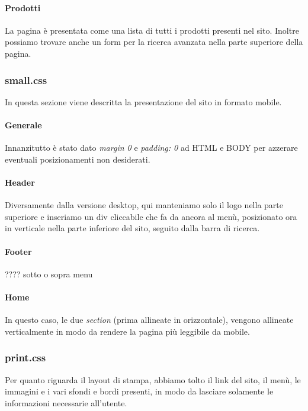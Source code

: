 \paragraph{Prodotti} \Spazio
La pagina è presentata come una lista di tutti i prodotti presenti nel sito.\newline
Inoltre possiamo trovare anche un form per la ricerca avanzata nella parte superiore della pagina. 


\subsubsection{small.css}
In questa sezione viene descritta la presentazione del sito in formato mobile.

\paragraph{Generale} \Spazio
Innanzitutto è stato dato \emph{margin 0} e \emph{padding: 0} ad HTML e BODY per azzerare eventuali posizionamenti non desiderati. 

\paragraph{Header} \Spazio
Diversamente dalla versione desktop, qui manteniamo solo il logo nella parte superiore e inseriamo un div cliccabile che fa da ancora al menù, posizionato ora in verticale nella parte inferiore del sito, seguito dalla barra di ricerca.\newline

\paragraph{Footer} \Spazio
???? sotto o sopra menu

\paragraph{Home} \Spazio
In questo caso, le due \emph{section} (prima allineate in orizzontale), vengono allineate verticalmente in modo da rendere la pagina più leggibile da mobile.


\subsubsection{print.css}
Per quanto riguarda il layout di stampa, abbiamo tolto il link del sito, il menù, le immagini e i vari sfondi e bordi presenti, in modo da lasciare solamente le informazioni necessarie all'utente.
